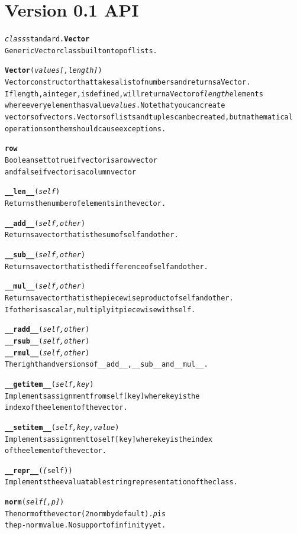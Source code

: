 \documentclass{book}
\begin{document}
\section{Version 0.1 API}
\begin{alltt}
\emph{class} standard.\textbf{Vector }
    Generic Vector class built on top of lists.

    \textbf{Vector}( \emph{ values [,length] } )
       Vector constructor that takes a list of numbers and returns a Vector.
       If length, a integer, is defined, will return a Vector of \emph{length} elements
       where every element has value \emph{values}. Note that you can create
       vectors of vectors. Vectors of lists and tuples can be created, but mathematical
       operations on them should cause exceptions.

    \textbf{row}
        Boolean set to true if vector is a row vector 
        and false if vector is a column vector

   \textbf{__len__}(\emph{self})
        Returns the number of elements in the vector.

    \textbf{__add__}( \emph{ self, other} )
         Returns a vector that is the sum of self and other.

    \textbf{__sub__}( \emph{ self, other} )
         Returns a vector that is the difference of self and other.

    \textbf{__mul__}( \emph{ self, other} )
         Returns a vector that is the piecewise product of self and other.
         If other is a scalar, multiply it piecewise with self.

    \textbf{__radd__}( \emph{ self, other} )
    \textbf{__rsub__}( \emph{ self, other} )
    \textbf{__rmul__}( \emph{ self, other} )
        The right hand versions of __add__, __sub__ and __mul__.

    \textbf{__getitem__}( \emph{ self, key} )
        Implements assignment from self[key] where key is the 
        index of the element of the vector.

    \textbf{__setitem__}( \emph{ self, key, value} )
        Implements assignment to self[key] where key is the index 
        of the element of the vector.

  \textbf{__repr__}(\emph(self) )
    Implements the evaluatable string representation of the class.

    \textbf{norm}(\emph{self[,p]})
        The norm of the vector (2 norm by default). \emph{p} is
         the p-norm value. No support of infinity yet.


\end{alltt}
\end{document}
